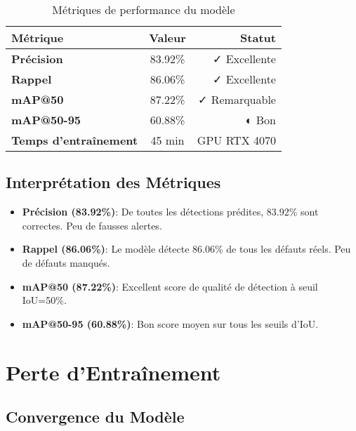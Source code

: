 \documentclass[a4paper,12pt]{report}
\begin{document}
\begin{table}[H]
    \centering
    \begin{tabular}{|l|c|r|}
    \hline
    \textbf{Métrique} & \textbf{Valeur} & \textbf{Statut} \\
    \hline
    \textbf{Précision} & 83.92\% & \cellcolor{green!30} ✓ Excellente \\
    \hline
    \textbf{Rappel} & 86.06\% & \cellcolor{green!30} ✓ Excellente \\
    \hline
    \textbf{mAP@50} & 87.22\% & \cellcolor{green!30} ✓ Remarquable \\
    \hline
    \textbf{mAP@50-95} & 60.88\% & \cellcolor{yellow!30} ◐ Bon \\
    \hline
    \textbf{Temps d'entraînement} & 45 min & GPU RTX 4070 \\
    \hline
    \end{tabular}
    \caption{Métriques de performance du modèle}
\end{table}

\subsection{Interprétation des Métriques}

\begin{itemize}
    \item \textbf{Précision (83.92\%)}: De toutes les détections prédites, 83.92\% sont correctes. Peu de fausses alertes.
    
    \item \textbf{Rappel (86.06\%)}: Le modèle détecte 86.06\% de tous les défauts réels. Peu de défauts manqués.
    
    \item \textbf{mAP@50 (87.22\%)}: Excellent score de qualité de détection à seuil IoU=50\%.
    
    \item \textbf{mAP@50-95 (60.88\%)}: Bon score moyen sur tous les seuils d'IoU.
\end{itemize}

\section{Perte d'Entraînement}

\subsection{Convergence du Modèle}
\end{document}
